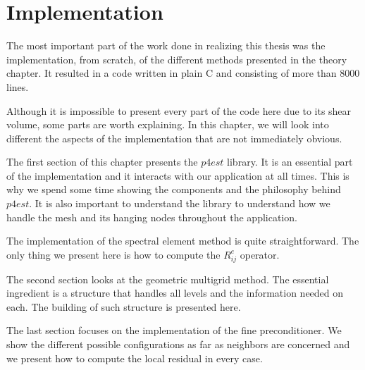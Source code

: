 \chapter{Implementation}

The most important part of the work done in realizing this thesis was the implementation, from scratch, of the different methods presented in the theory chapter. It resulted in a code written in plain C and consisting of more than 8000 lines. 

Although it is impossible to present every part of the code here due to its shear volume, some parts are worth explaining. In this chapter, we will look into different the aspects of the implementation that are not immediately obvious.   

The first section of this chapter presents the $p4est$ library. It is an essential part of the implementation and it interacts with our application at all times. This is why we spend some time showing the components and the philosophy behind $p4est$. It is also important to understand the library to understand how we handle the mesh and its hanging nodes throughout the application.

The implementation of the spectral element method is quite straightforward. The only thing we present here is how to compute the $R_{ij}^e$ operator. 

The second section looks at the geometric multigrid method. The essential ingredient is a structure that handles all levels and the information needed on each. The building of such structure is presented here. 

The last section focuses on the implementation of the fine preconditioner. We show the different possible configurations as far as neighbors are concerned and we present how to compute the local residual in every case.  

